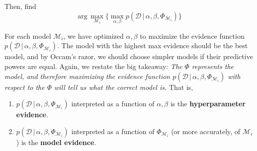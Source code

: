   Then, find
  \begin{equation}
    \text{arg}\, \max_{\mathcal{M}_i} \{ \max_{\alpha, \beta} p(\mathcal{D}\,|\,\alpha, \beta, \Phi_{\mathcal{M}_i}) \}
  \end{equation}

  For each model $\mathcal{M}_i$, we have optimized $\alpha, \beta$ to maximize the evidence function $p(\mathcal{D}\,|\,\alpha, \beta, \Phi_{\mathcal{M}_i})$. The model with the highest max evidence should be the best model, and by Occam's razor, we should choose simpler models if their predictive powers are equal. Again, we restate the big takeaway: \textit{The $\Phi$ represents the model, and therefore maximizing the evidence function $p(\mathcal{D}\,|\, \alpha, \beta, \Phi_{\mathcal{M}_i})$ with respect to the $\Phi$ will tell us what the correct model is.} That is,
  \begin{enumerate}
    \item $p(\mathcal{D}\,|\, \alpha, \beta, \Phi_{\mathcal{M}_i})$ interpreted as a function of $\alpha, \beta$ is the \textbf{hyperparameter evidence}.
    \item $p(\mathcal{D}\,|\, \alpha, \beta, \Phi_{\mathcal{M}_i})$ interpreted as a function of $\Phi_{\mathcal{M}_i}$ (or more accurately, of $\mathcal{M}_i$) is the \textbf{model evidence}.
  \end{enumerate}


